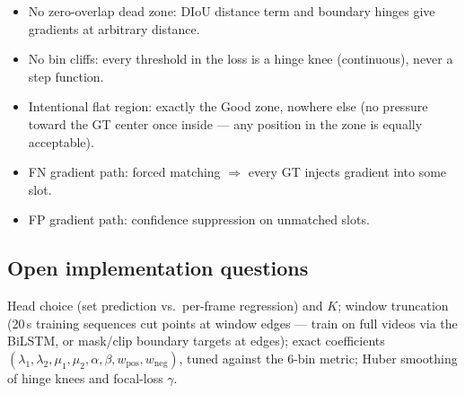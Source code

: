 \documentclass[11pt]{article}
\begin{document}
\begin{itemize}[nosep]
  \item No zero-overlap dead zone: DIoU distance term and boundary hinges give gradients
        at arbitrary distance.
  \item No bin cliffs: every threshold in the loss is a hinge knee (continuous), never a
        step function.
  \item Intentional flat region: exactly the Good zone, nowhere else (no pressure toward
        the GT center once inside --- any position in the zone is equally acceptable).
  \item FN gradient path: forced matching $\Rightarrow$ every GT injects gradient into
        some slot.
  \item FP gradient path: confidence suppression on unmatched slots.
\end{itemize}

\subsection{Open implementation questions}

Head choice (set prediction vs.\ per-frame regression) and $K$; window truncation
(20\,s training sequences cut points at window edges --- train on full videos via the
BiLSTM, or mask/clip boundary targets at edges); exact coefficients
$(\lambda_1, \lambda_2, \mu_1, \mu_2, \alpha, \beta, w_{\text{pos}}, w_{\text{neg}})$,
tuned against the 6-bin metric; Huber smoothing of hinge knees and focal-loss $\gamma$.
\end{document}
